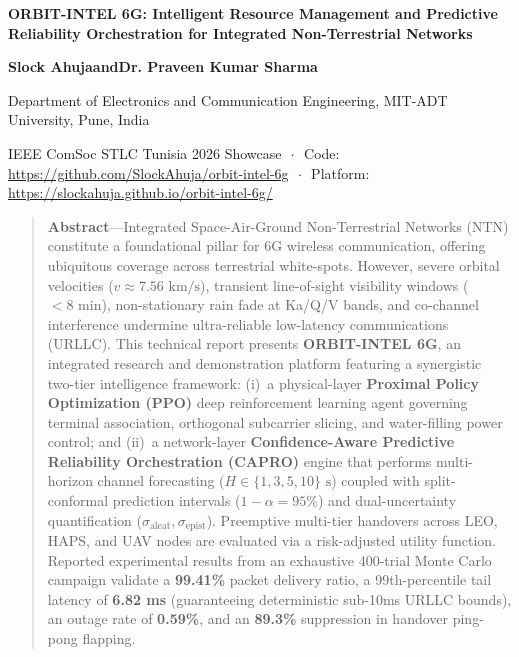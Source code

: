 \documentclass[9pt,a4paper]{article}
\begin{document}
\begin{center}
  {\large\bfseries ORBIT-INTEL 6G: Intelligent Resource Management and Predictive\\[1pt]
  Reliability Orchestration for Integrated Non-Terrestrial Networks\par}
  \vspace{2pt}
  {\small\bfseries Slock Ahuja\quad and\quad Dr. Praveen Kumar Sharma\par}
  \vspace{1pt}
  {\footnotesize Department of Electronics and Communication Engineering, MIT-ADT University, Pune, India\par}
  \vspace{0.5pt}
  {\scriptsize IEEE ComSoc STLC Tunisia 2026 Showcase $\,\cdot\,$ Code: \url{https://github.com/SlockAhuja/orbit-intel-6g} $\,\cdot\,$ Platform: \url{https://slockahuja.github.io/orbit-intel-6g/}\par}
\end{center}

\vspace{-6pt}
\begin{quote}
\footnotesize\textbf{Abstract}---Integrated Space-Air-Ground Non-Terrestrial Networks (NTN) constitute a foundational pillar for 6G wireless communication, offering ubiquitous coverage across terrestrial white-spots. However, severe orbital velocities ($v \approx 7.56\text{ km/s}$), transient line-of-sight visibility windows ($<8\text{ min}$), non-stationary rain fade at Ka/Q/V bands, and co-channel interference undermine ultra-reliable low-latency communications (URLLC). This technical report presents \textbf{ORBIT-INTEL 6G}, an integrated research and demonstration platform featuring a synergistic two-tier intelligence framework: (i)~a physical-layer \textbf{Proximal Policy Optimization (PPO)} deep reinforcement learning agent governing terminal association, orthogonal subcarrier slicing, and water-filling power control; and (ii)~a network-layer \textbf{Confidence-Aware Predictive Reliability Orchestration (CAPRO)} engine that performs multi-horizon channel forecasting ($H \in \{1, 3, 5, 10\}\text{ s}$) coupled with split-conformal prediction intervals ($1-\alpha=95\%$) and dual-uncertainty quantification ($\sigma_{\text{aleat}}, \sigma_{\text{epist}}$). Preemptive multi-tier handovers across LEO, HAPS, and UAV nodes are evaluated via a risk-adjusted utility function. Reported experimental results from an exhaustive 400-trial Monte Carlo campaign validate a \textbf{99.41\%} packet delivery ratio, a 99th-percentile tail latency of \textbf{6.82 ms} (guaranteeing deterministic sub-10ms URLLC bounds), an outage rate of \textbf{0.59\%}, and an \textbf{89.3\%} suppression in handover ping-pong flapping.
\end{quote}
\vspace{-4pt}
\end{document}
